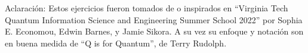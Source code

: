 \documentclass[aps,superscriptaddress]{revtex4}
\begin{document}

\author{C. Cormick}


\\

\\

\vspace{20pt}

\noindent Aclaraci\'on: Estos ejercicios fueron tomados de o inspirados en ``Virginia Tech Quantum Information Science and Engineering Summer School 2022'' por Sophia E. Economou, Edwin Barnes, y Jamie Sikora. A su vez su enfoque y notaci\'on son en buena medida de ``Q is for Quantum'', de Terry Rudolph.

\medskip
\end{document}
